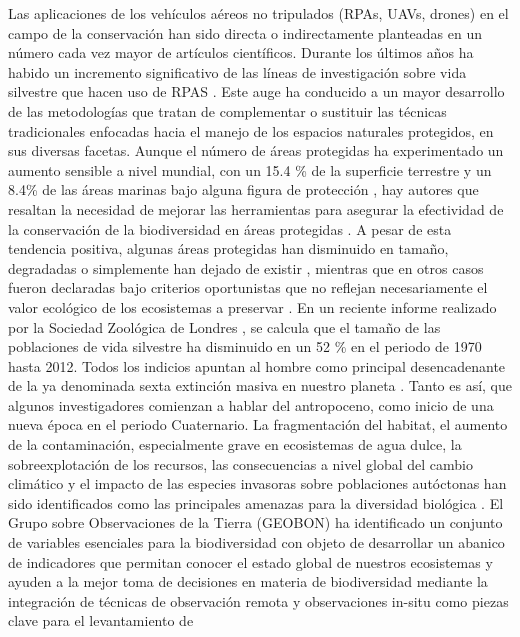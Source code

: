 \documentclass[11pt,]{article}
\begin{document}
Las aplicaciones de los vehículos aéreos no tripulados (RPAs, UAVs,
drones) en el campo de la conservación han sido directa o indirectamente
planteadas en un número cada vez mayor de artículos científicos. Durante
los últimos años ha habido un incremento significativo de las líneas de
investigación sobre vida silvestre que hacen uso de RPAS
\citep{Linchant2015}. Este auge ha conducido a un mayor desarrollo de
las metodologías que tratan de complementar o sustituir las técnicas
tradicionales enfocadas hacia el manejo de los espacios naturales
protegidos, en sus diversas facetas. Aunque el número de áreas
protegidas ha experimentado un aumento sensible a nivel mundial, con un
15.4 \% de la superficie terrestre y un 8.4\% de las áreas marinas bajo
alguna figura de protección \citep{juffe2014protected} , hay autores que
resaltan la necesidad de mejorar las herramientas para asegurar la
efectividad de la conservación de la biodiversidad en áreas protegidas
\citep{Chape2005}. A pesar de esta tendencia positiva, algunas áreas
protegidas han disminuido en tamaño, degradadas o simplemente han dejado
de existir \citep{Mascia2011}, mientras que en otros casos fueron
declaradas bajo criterios oportunistas que no reflejan necesariamente el
valor ecológico de los ecosistemas a preservar \citep{Knight2007}. En un
reciente informe realizado por la Sociedad Zoológica de Londres
\citep{Living2016} , se calcula que el tamaño de las poblaciones de vida
silvestre ha disminuido en un 52 \% en el periodo de 1970 hasta 2012.
Todos los indicios apuntan al hombre como principal desencadenante de la
ya denominada sexta extinción masiva en nuestro planeta
\citep{Barnosky2011}. Tanto es así, que algunos investigadores comienzan
a hablar del antropoceno, como inicio de una nueva época en el periodo
Cuaternario. La fragmentación del habitat, el aumento de la
contaminación, especialmente grave en ecosistemas de agua dulce, la
sobreexplotación de los recursos, las consecuencias a nivel global del
cambio climático y el impacto de las especies invasoras sobre
poblaciones autóctonas han sido identificados como las principales
amenazas para la diversidad biológica . El Grupo sobre Observaciones de
la Tierra (GEOBON) ha identificado un conjunto de variables esenciales
para la biodiversidad \citep{Pereira2013} con objeto de desarrollar un
abanico de indicadores que permitan conocer el estado global de nuestros
ecosistemas y ayuden a la mejor toma de decisiones en materia de
biodiversidad mediante la integración de técnicas de observación remota
y observaciones in-situ como piezas clave para el levantamiento de
\end{document}
